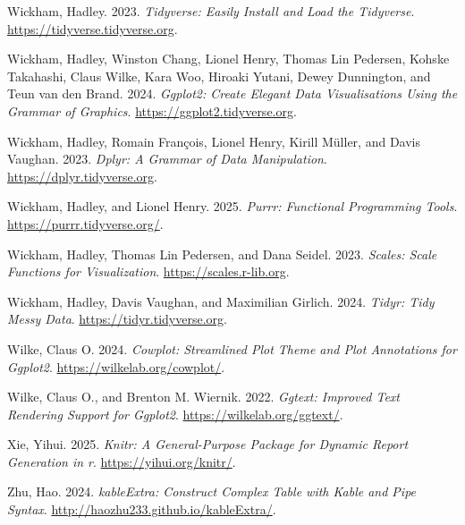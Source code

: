 \documentclass[
]{article}
\newlength{\cslhangindent}
\newenvironment{CSLReferences}[2] %
 {\begin{list}{}{%
  \setlength{\itemindent}{0pt}
  \setlength{\leftmargin}{0pt}
  \setlength{\parsep}{0pt}
  \ifodd #1
   \setlength{\leftmargin}{\cslhangindent}
   \setlength{\itemindent}{-1\cslhangindent}
  \fi
  \setlength{\itemsep}{#2\baselineskip}}}
 {\end{list}}
\begin{document}
\begin{CSLReferences}{1}{0}
Wickham, Hadley. 2023. \emph{Tidyverse: Easily Install and Load the
Tidyverse}. \url{https://tidyverse.tidyverse.org}.

Wickham, Hadley, Winston Chang, Lionel Henry, Thomas Lin Pedersen,
Kohske Takahashi, Claus Wilke, Kara Woo, Hiroaki Yutani, Dewey
Dunnington, and Teun van den Brand. 2024. \emph{Ggplot2: Create Elegant
Data Visualisations Using the Grammar of Graphics}.
\url{https://ggplot2.tidyverse.org}.

Wickham, Hadley, Romain François, Lionel Henry, Kirill Müller, and Davis
Vaughan. 2023. \emph{Dplyr: A Grammar of Data Manipulation}.
\url{https://dplyr.tidyverse.org}.

Wickham, Hadley, and Lionel Henry. 2025. \emph{Purrr: Functional
Programming Tools}. \url{https://purrr.tidyverse.org/}.

Wickham, Hadley, Thomas Lin Pedersen, and Dana Seidel. 2023.
\emph{Scales: Scale Functions for Visualization}.
\url{https://scales.r-lib.org}.

Wickham, Hadley, Davis Vaughan, and Maximilian Girlich. 2024.
\emph{Tidyr: Tidy Messy Data}. \url{https://tidyr.tidyverse.org}.

Wilke, Claus O. 2024. \emph{Cowplot: Streamlined Plot Theme and Plot
Annotations for Ggplot2}. \url{https://wilkelab.org/cowplot/}.

Wilke, Claus O., and Brenton M. Wiernik. 2022. \emph{Ggtext: Improved
Text Rendering Support for Ggplot2}. \url{https://wilkelab.org/ggtext/}.

Xie, Yihui. 2025. \emph{Knitr: A General-Purpose Package for Dynamic
Report Generation in r}. \url{https://yihui.org/knitr/}.

Zhu, Hao. 2024. \emph{kableExtra: Construct Complex Table with Kable and
Pipe Syntax}. \url{http://haozhu233.github.io/kableExtra/}.

\end{CSLReferences}
\end{document}
